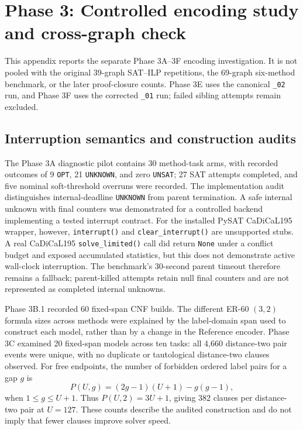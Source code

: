 \section{Phase 3: Controlled encoding study and cross-graph check}
\label{sec:phase3-study}
This appendix reports the separate Phase 3A--3F encoding investigation.
It is not pooled with the original 39-graph SAT--ILP repetitions, the
69-graph six-method benchmark, or the later proof-closure counts. Phase 3E
uses the canonical \texttt{\_02} run, and Phase 3F uses the corrected
\texttt{\_01} run;
failed sibling attempts remain excluded.

\subsection{Interruption semantics and construction audits}
The Phase 3A diagnostic pilot contains 30 method-task arms, with recorded
outcomes of 9 \texttt{OPT}, 21 \texttt{UNKNOWN}, and zero \texttt{UNSAT};
27 SAT attempts completed, and five nominal soft-threshold overruns were
recorded. The implementation audit distinguishes internal-deadline
\texttt{UNKNOWN} from parent termination. A safe internal unknown with
final counters was demonstrated for a controlled backend implementing a
tested interrupt contract. For the installed PySAT CaDiCaL195 wrapper,
however, \texttt{interrupt()} and \texttt{clear\_interrupt()} are
unsupported stubs. A real CaDiCaL195 \texttt{solve\_limited()} call did
return \texttt{None} under a conflict budget and exposed accumulated
statistics, but this does not demonstrate active wall-clock interruption.
The benchmark's 30-second parent timeout therefore remains a fallback;
parent-killed attempts retain null final counters and are not represented
as completed internal unknowns.

Phase 3B.1 recorded 60 fixed-span CNF builds. The different ER-60
$(3,2)$ formula sizes across methods were explained by the label-domain
span used to construct each model, rather than by a change in the
Reference encoder. Phase 3C examined 20 fixed-span models across ten
tasks: all 4,660 distance-two pair events were unique, with no duplicate
or tautological distance-two clauses observed. For free endpoints, the
number of forbidden ordered label pairs for a gap $g$ is
\[
 P(U,g)=(2g-1)(U+1)-g(g-1),
\]
when $1\leq g\leq U+1$. Thus $P(U,2)=3U+1$, giving 382 clauses per
distance-two pair at $U=127$. These counts describe the audited
construction and do not imply that fewer clauses improve solver speed.

